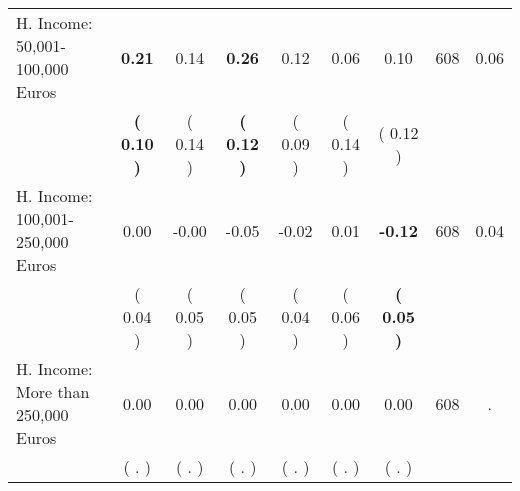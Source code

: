 \begin{tabular}{lcccccccc}
H. Income: 50,001-100,000 Euros & \textbf{     0.21} &      0.14 & \textbf{     0.26} &      0.12 &      0.06 &      0.10 & 608 &       0.06 \\ 
 & \textbf{(     0.10 )} & (     0.14 ) & \textbf{(     0.12 )} & (     0.09 ) & (     0.14 ) & (     0.12 ) & \\
H. Income: 100,001-250,000 Euros &      0.00 &     -0.00 &     -0.05 &     -0.02 &      0.01 & \textbf{    -0.12} & 608 &       0.04 \\ 
 & (     0.04 ) & (     0.05 ) & (     0.05 ) & (     0.04 ) & (     0.06 ) & \textbf{(     0.05 )} & \\
H. Income: More than 250,000 Euros &      0.00 &      0.00 &      0.00 &      0.00 &      0.00 &      0.00 & 608 &          . \\ 
 & (        . ) & (        . ) & (        . ) & (        . ) & (        . ) & (        . ) & \\
\bottomrule
\end{tabular}
